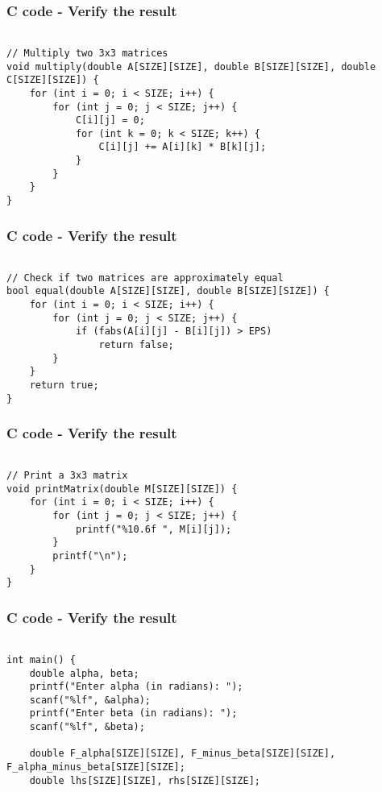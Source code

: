 \documentclass{beamer}
\begin{document}
\begin{frame}[fragile]                            
\frametitle{C code - Verify the result}                
\begin{lstlisting}

// Multiply two 3x3 matrices
void multiply(double A[SIZE][SIZE], double B[SIZE][SIZE], double C[SIZE][SIZE]) {
    for (int i = 0; i < SIZE; i++) {
        for (int j = 0; j < SIZE; j++) {
            C[i][j] = 0;
            for (int k = 0; k < SIZE; k++) {
                C[i][j] += A[i][k] * B[k][j];
            }
        }
    }
}
\end{lstlisting}
\end{frame}

\begin{frame}[fragile]                            
\frametitle{C code - Verify the result}                
\begin{lstlisting}

// Check if two matrices are approximately equal
bool equal(double A[SIZE][SIZE], double B[SIZE][SIZE]) {
    for (int i = 0; i < SIZE; i++) {
        for (int j = 0; j < SIZE; j++) {
            if (fabs(A[i][j] - B[i][j]) > EPS)
                return false;
        }
    }
    return true;
}
\end{lstlisting}
\end{frame}

\begin{frame}[fragile]                            
\frametitle{C code - Verify the result}                
\begin{lstlisting}

// Print a 3x3 matrix
void printMatrix(double M[SIZE][SIZE]) {
    for (int i = 0; i < SIZE; i++) {
        for (int j = 0; j < SIZE; j++) {
            printf("%10.6f ", M[i][j]);
        }
        printf("\n");
    }
}
\end{lstlisting}
\end{frame}

\begin{frame}[fragile]                            
\frametitle{C code - Verify the result}                
\begin{lstlisting}

int main() {
    double alpha, beta;
    printf("Enter alpha (in radians): ");
    scanf("%lf", &alpha);
    printf("Enter beta (in radians): ");
    scanf("%lf", &beta);

    double F_alpha[SIZE][SIZE], F_minus_beta[SIZE][SIZE], F_alpha_minus_beta[SIZE][SIZE];
    double lhs[SIZE][SIZE], rhs[SIZE][SIZE];
\end{lstlisting}
\end{frame}
\end{document}
